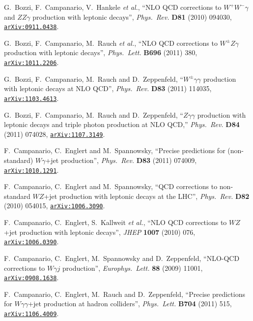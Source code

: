 \documentclass[english,12pt]{article}
\begin{document}
\begin{thebibliography}{10}
  G.~Bozzi, F.~Campanario, V.~Hankele {\it et al.},
  ``{NLO QCD corrections to $W^+W^- \gamma$ and $Z Z \gamma$ production with leptonic decays}'',
  {\em Phys.\ Rev.}  {\bf D81} (2010) 094030,
\href{http://www.arXiv.org/abs/0911.0438}{{\tt arXiv:0911.0438}}.

  G.~Bozzi, F.~Campanario, M.~Rauch  {\it et al.},
  ``NLO QCD corrections to $W^\pm Z\gamma$ production with leptonic decays'',
  {\em Phys.\ Lett.} {\bf B696} (2011) 380,
\href{http://www.arXiv.org/abs/1011.2206}{{\tt arXiv:1011.2206}}.
  
  G.~Bozzi, F.~Campanario, M.~Rauch and D.~Zeppenfeld,
  ``$W^{\pm}\gamma \gamma$ production with leptonic decays at NLO QCD'',
  {\em Phys.\ Rev.}  {\bf D83} (2011) 114035,
  \href{http://arxiv.org/abs/1103.4613}{{\tt arXiv:1103.4613}}.

  G.~Bozzi, F.~Campanario, M.~Rauch and D.~Zeppenfeld,
  ``$Z\gamma\gamma$ production with leptonic decays and triple photon production at NLO QCD,''
  {\em Phys.\ Rev.} {\bf D84} (2011) 074028,
  \href{http://arxiv.org/abs/1107.3149}{{\tt arXiv:1107.3149}}.
  
  F.~Campanario, C.~Englert and M.~Spannowsky,
  ``Precise predictions for (non-standard) $W \gamma$+jet production'',
  {\em Phys.\ Rev.}  {\bf D83} (2011) 074009,
  \href{http://arxiv.org/abs/1010.1291}{{\tt arXiv:1010.1291}}.
 
  F.~Campanario, C.~Englert and M.~Spannowsky,
  ``QCD corrections to non-standard $WZ$+jet production with leptonic decays at
  the LHC'',
  {\em Phys.\ Rev.} {\bf D82} (2010) 054015,
\href{http://www.arXiv.org/abs/1006.3090}{{\tt arXiv:1006.3090}}.
  
  F.~Campanario, C.~Englert, S.~Kallweit {\it et al.},
  ``{NLO QCD corrections to $WZ$+jet production with leptonic decays}'',
  {\em JHEP} {\bf 1007} (2010) 076,
\href{http://www.arXiv.org/abs/1006.0390}{{\tt arXiv:1006.0390}}.
   
  F.~Campanario, C.~Englert, M.~Spannowsky and D.~Zeppenfeld,
  ``NLO-QCD corrections to $W\gamma j$ production'',
  {\em Europhys.\ Lett.}  {\bf 88} (2009) 11001,
\href{http://www.arXiv.org/abs/0908.1638}{{\tt arXiv:0908.1638}}.

  F.~Campanario, C.~Englert, M.~Rauch and D.~Zeppenfeld,
  ``Precise predictions for $W \gamma \gamma$+jet production at hadron colliders'',
  {\em Phys.\ Lett.} {\bf B704} (2011) 515,
  \href{http://www.arXiv.org/abs/1106.4009}{{\tt arXiv:1106.4009}}.


\end{thebibliography}
\end{document}
